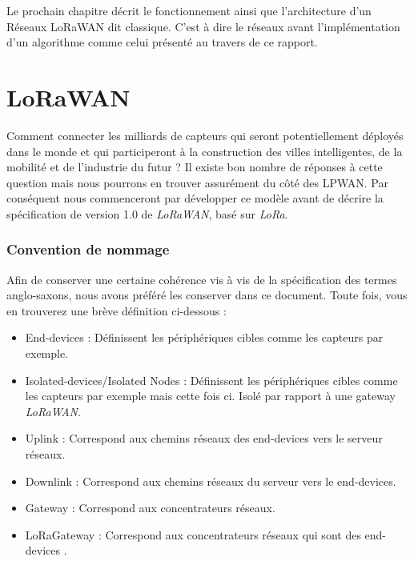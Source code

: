 Le prochain chapitre décrit le fonctionnement ainsi que l'architecture d'un Réseaux LoRaWAN dit classique. C'est à dire le réseaux avant l'implémentation d'un algorithme comme celui présenté au travers de ce rapport.
\chapter{LoRaWAN}
Comment connecter les milliards de capteurs qui seront potentiellement déployés dans le monde et qui participeront à la construction des villes intelligentes, de la mobilité et de l'industrie du futur ? \newline
Il existe bon nombre de réponses à cette question mais nous pourrons en trouver assurément du côté des LPWAN. Par conséquent nous commenceront par développer ce modèle avant de décrire la spécification de version 1.0 de  \textit{LoRaWAN}, basé sur \textit{LoRa}.
\subsection{Convention de nommage }
Afin de conserver une certaine cohérence vis à vis de la spécification des termes anglo-saxons, nous avons préféré les conserver dans ce document. Toute fois, vous en trouverez une brève définition ci-dessous : 
\begin{itemize}
\item End-devices : Définissent les périphériques cibles comme les capteurs par exemple.
\item Isolated-devices/Isolated Nodes : Définissent les périphériques cibles comme les capteurs par exemple  mais cette fois ci. Isolé par rapport à une gateway  \textit{LoRaWAN}.
\item Uplink : Correspond aux chemins réseaux des end-devices vers le serveur réseaux. 
\item Downlink : Correspond aux chemins réseaux du serveur vers le end-devices. 
\item Gateway : Correspond aux concentrateurs réseaux. 
\item LoRaGateway : Correspond aux concentrateurs réseaux qui sont des end-devices . 
\end{itemize}



